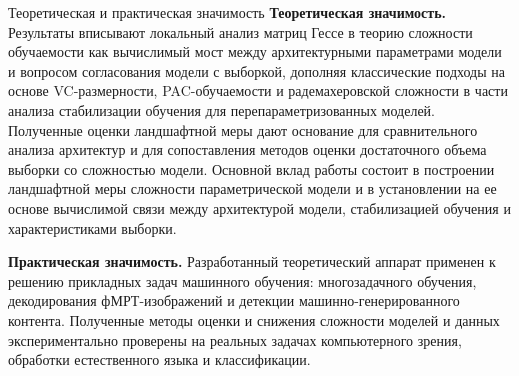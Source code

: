 \documentclass[9pt,pdf,hyperref={unicode}]{beamer}
\begin{document}
\begin{frame}{Теоретическая и практическая значимость}
\justifying
\small
\textbf{Теоретическая значимость.} Результаты вписывают локальный анализ матриц Гессе в теорию сложности обучаемости как вычислимый мост между архитектурными параметрами модели и вопросом согласования модели с выборкой, дополняя классические подходы на основе VC-размерности, PAC-обучаемости и радемахеровской сложности в части анализа стабилизации обучения для перепараметризованных моделей.
Полученные оценки ландшафтной меры дают основание для сравнительного анализа архитектур и для сопоставления методов оценки достаточного объема выборки со сложностью модели.
Основной вклад работы состоит в построении ландшафтной меры сложности параметрической модели и в установлении на ее основе вычислимой связи между архитектурой модели, стабилизацией обучения и характеристиками выборки.

\vspace{0.3cm}
\textbf{Практическая значимость.} Разработанный теоретический аппарат применен к решению прикладных задач машинного обучения: многозадачного обучения, декодирования фМРТ-изображений и детекции машинно-генерированного контента.
Полученные методы оценки и снижения сложности моделей и данных экспериментально проверены на реальных задачах компьютерного зрения, обработки естественного языка и классификации.
\end{frame}
\end{document}

